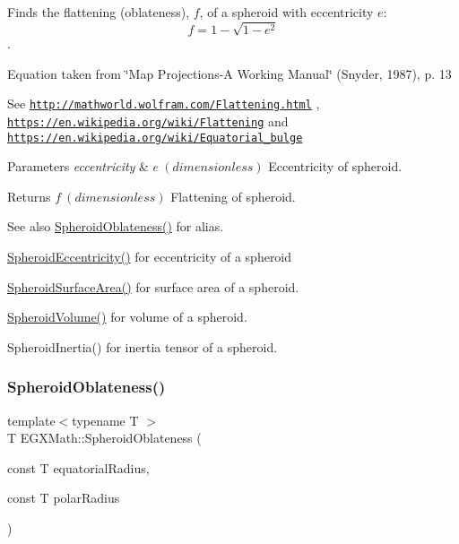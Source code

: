 Finds the flattening (oblateness), $f$, of a spheroid with eccentricity $e$\+: \[ f = 1 - \sqrt{1-e^2} \]. 

Equation taken from \char`\"{}\+Map Projections-\/\+A Working Manual\char`\"{} (Snyder, 1987), p. 13

See \href{http://mathworld.wolfram.com/Flattening.html}{\tt http\+://mathworld.\+wolfram.\+com/\+Flattening.\+html} , \href{https://en.wikipedia.org/wiki/Flattening}{\tt https\+://en.\+wikipedia.\+org/wiki/\+Flattening} and \href{https://en.wikipedia.org/wiki/Equatorial_bulge}{\tt https\+://en.\+wikipedia.\+org/wiki/\+Equatorial\+\_\+bulge} 
\begin{DoxyParams}{Parameters}
{\em eccentricity} & $ e\ (dimensionless)$ Eccentricity of spheroid. \\
\hline
\end{DoxyParams}
\begin{DoxyReturn}{Returns}
$ f\ (dimensionless)$ Flattening of spheroid. 
\end{DoxyReturn}
\begin{DoxySeeAlso}{See also}
\mbox{\hyperlink{group___e_g_x_math-_geometry-3_d-_spheroid-_flattening_ga486adfc58b047197daf87f50b2039ca7}{Spheroid\+Oblateness()}} for alias. 

\mbox{\hyperlink{group___e_g_x_math-_geometry-3_d-_spheroid-_eccentricity_gab45680528a41bb7a5e15ddc0059156dd}{Spheroid\+Eccentricity()}} for eccentricity of a spheroid 

\mbox{\hyperlink{group___e_g_x_math-_geometry-3_d-_spheroid-_surface_area_ga32a21d075102ea9a235a43165675627e}{Spheroid\+Surface\+Area()}} for surface area of a spheroid. 

\mbox{\hyperlink{group___e_g_x_math-_geometry-3_d-_spheroid-_volume_gac89ed1e10e56c724b341591ecc5605dc}{Spheroid\+Volume()}} for volume of a spheroid. 

Spheroid\+Inertia() for inertia tensor of a spheroid. 
\end{DoxySeeAlso}
\mbox{\label{group___e_g_x_math-_geometry-3_d-_spheroid-_flattening_ga8f547f5dd10721862b602c7769eb6116}} 
\subsubsection{\texorpdfstring{Spheroid\+Oblateness()}{SpheroidOblateness()}\hspace{0.1cm}{\footnotesize\ttfamily [1/2]}}
{\footnotesize\ttfamily template$<$typename T $>$ \\
T E\+G\+X\+Math\+::\+Spheroid\+Oblateness (\begin{DoxyParamCaption}\item[{const T}]{equatorial\+Radius,  }\item[{const T}]{polar\+Radius }\end{DoxyParamCaption})}



